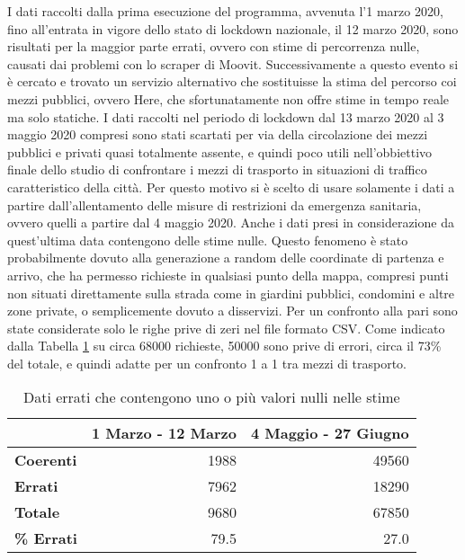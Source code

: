 I dati raccolti dalla prima esecuzione del programma, avvenuta l'1 marzo 2020, fino all'entrata in vigore dello stato di lockdown nazionale, il 12 marzo 2020, sono risultati per la maggior parte errati, ovvero con stime di percorrenza nulle, causati dai problemi con lo scraper di Moovit. Successivamente a questo evento si è cercato e trovato un servizio alternativo che sostituisse la stima del percorso coi mezzi pubblici, ovvero Here, che sfortunatamente non offre stime in tempo reale ma solo statiche. I dati raccolti nel periodo di lockdown dal 13 marzo 2020 al 3 maggio 2020 compresi sono stati scartati per via della circolazione dei mezzi pubblici e privati quasi totalmente assente, e quindi poco utili nell'obbiettivo finale dello studio di confrontare i mezzi di trasporto in situazioni di traffico caratteristico della città. Per questo motivo si è scelto di usare solamente i dati a partire dall'allentamento delle misure di restrizioni da emergenza sanitaria, ovvero quelli a partire dal 4 maggio 2020. Anche i dati presi in considerazione da quest'ultima data contengono delle stime nulle. Questo fenomeno è stato probabilmente dovuto alla generazione a random delle coordinate di partenza e arrivo, che ha permesso richieste in qualsiasi punto della mappa, compresi punti non situati direttamente sulla strada come in giardini pubblici, condomini e altre zone private, o semplicemente dovuto a disservizi. Per un confronto alla pari sono state considerate solo le righe prive di zeri nel file formato CSV. Come indicato dalla Tabella \ref{table:1} su circa 68000 richieste, 50000 sono prive di errori, circa il 73\% del totale, e quindi adatte per un confronto 1 a 1 tra mezzi di trasporto.

\begin{table}[H]
	\centering
	\begin{tabular}{ | l | r | r | }
		\hline
		
		& \textbf{1 Marzo - 12 Marzo} & \textbf{4 Maggio - 27 Giugno} \\
		\hline
		
		\textbf{Coerenti}& 1988 & 49560 \\  
		\textbf{Errati} & 7962 & 18290 \\
		\hline
		\textbf{Totale} & 9680 & 67850 \\
		\textbf{\% Errati} & 79.5 & 27.0 \\
		\hline
	\end{tabular}
	\caption{Dati errati che contengono uno o più valori nulli nelle stime}
	\label{table:1}
\end{table}

